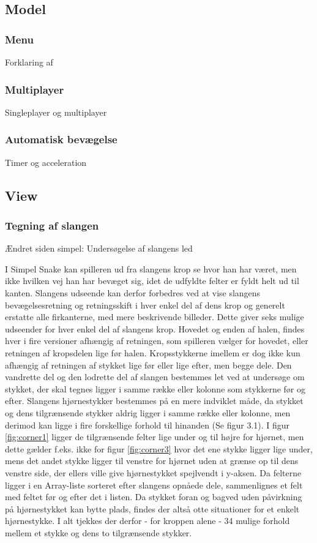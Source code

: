 \subsection{Model}
\subsubsection{Menu}
Forklaring af

\subsubsection{Multiplayer}
Singleplayer og multiplayer

\subsubsection{Automatisk bevægelse}
Timer og acceleration


\subsection{View}
\subsubsection{Tegning af slangen}
Ændret siden simpel: Undersøgelse af slangens led

I Simpel Snake kan spilleren ud fra slangens krop se hvor han har været, men ikke hvilken vej han har bevæget sig, idet de udfyldte felter er fyldt helt ud til kanten. Slangens udseende kan derfor forbedres ved at vise slangens bevægelsesretning og retningsskift i hver enkel del af dens krop og generelt erstatte alle firkanterne, med mere beskrivende billeder. Dette giver seks mulige udseender for hver enkel del af slangens krop. Hovedet og enden af halen, findes hver i fire versioner afhængig af retningen, som spilleren vælger for hovedet, eller retningen af kropsdelen lige før halen. Kropsstykkerne imellem er dog ikke kun afhængig af retningen af stykket lige før eller lige efter, men begge dele. Den vandrette del og den lodrette del af slangen bestemmes let ved at undersøge om stykket, der skal tegnes ligger i samme række eller kolonne som stykkerne før og efter. Slangens hjørnestykker bestemmes på en mere indviklet måde, da stykket og dens tilgrænsende stykker aldrig ligger i samme række eller kolonne, men derimod kan ligge i fire forskellige forhold til hinanden (Se figur 3.1). I figur \ref{fig:corner1} ligger de tilgrænsende felter lige under og til højre for hjørnet, men dette gælder f.eks. ikke for figur \ref{fig:corner3} hvor det ene stykke ligger lige under, mens det andet stykke ligger til venstre for hjørnet uden at grænse op til dens venstre side, der ellers ville give hjørnestykket spejlvendt i y-aksen. Da felterne ligger i en Array-liste sorteret efter slangens opnåede dele, sammenlignes et felt med feltet før og efter det i listen. Da stykket foran og bagved uden påvirkning på hjørnestykket kan bytte plads, findes der altså otte situationer for et enkelt hjørnestykke. I alt tjekkes der derfor - for kroppen alene - 34 mulige forhold mellem et stykke og dens to tilgrænsende stykker.
\linebreak

